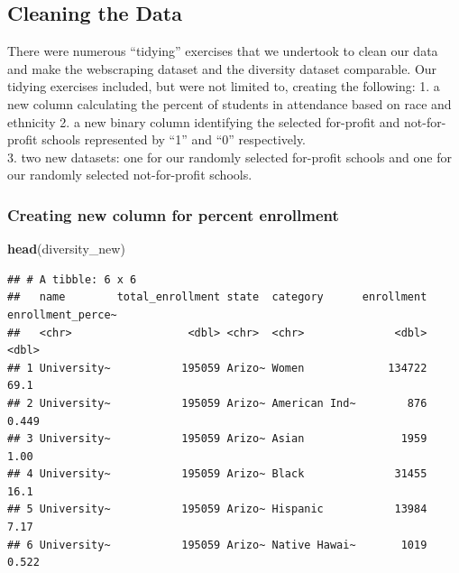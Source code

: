 \documentclass[
]{article}
\newenvironment{Shaded}{\begin{snugshade}}{\end{snugshade}}
\newcommand{\DataTypeTok}[1]{\textcolor[rgb]{0.13,0.29,0.53}{#1}}
\newcommand{\DecValTok}[1]{\textcolor[rgb]{0.00,0.00,0.81}{#1}}
\newcommand{\KeywordTok}[1]{\textcolor[rgb]{0.13,0.29,0.53}{\textbf{#1}}}
\newcommand{\NormalTok}[1]{#1}
\newcommand{\OperatorTok}[1]{\textcolor[rgb]{0.81,0.36,0.00}{\textbf{#1}}}
\newcommand{\StringTok}[1]{\textcolor[rgb]{0.31,0.60,0.02}{#1}}
\begin{document}
\hypertarget{cleaning-the-data}{%
\subsection{\texorpdfstring{\textbf{Cleaning the
Data}}{Cleaning the Data}}\label{cleaning-the-data}}

There were numerous ``tidying'' exercises that we undertook to clean our
data and make the webscraping dataset and the diversity dataset
comparable. Our tidying exercises included, but were not limited to,
creating the following: 1. a new column calculating the percent of
students in attendance based on race and ethnicity 2. a new binary
column identifying the selected for-profit and not-for-profit schools
represented by ``1'' and ``0'' respectively.\\
3. two new datasets: one for our randomly selected for-profit schools
and one for our randomly selected not-for-profit schools.

\hypertarget{creating-new-column-for-percent-enrollment}{%
\subsubsection{Creating new column for percent
enrollment}\label{creating-new-column-for-percent-enrollment}}

\begin{Shaded}
\end{Shaded}

\begin{Shaded}
\begin{Highlighting}[]
\KeywordTok{head}\NormalTok{(diversity_new)}
\end{Highlighting}
\end{Shaded}

\begin{verbatim}
## # A tibble: 6 x 6
##   name        total_enrollment state  category      enrollment enrollment_perce~
##   <chr>                  <dbl> <chr>  <chr>              <dbl>             <dbl>
## 1 University~           195059 Arizo~ Women             134722            69.1  
## 2 University~           195059 Arizo~ American Ind~        876             0.449
## 3 University~           195059 Arizo~ Asian               1959             1.00 
## 4 University~           195059 Arizo~ Black              31455            16.1  
## 5 University~           195059 Arizo~ Hispanic           13984             7.17 
## 6 University~           195059 Arizo~ Native Hawai~       1019             0.522
\end{verbatim}
\end{document}
